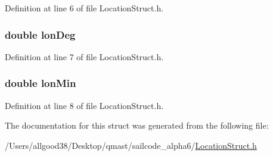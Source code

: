 \-Definition at line 6 of file \-Location\-Struct.\-h.

\hypertarget{structpoints_aa9d469451b350f942a352bf3a813fe81}{
\subsubsection[{lon\-Deg}]{\setlength{\rightskip}{0pt plus 5cm}double {\bf lon\-Deg}}}
\label{structpoints_aa9d469451b350f942a352bf3a813fe81}


\-Definition at line 7 of file \-Location\-Struct.\-h.

\hypertarget{structpoints_a1122975e5c72c0ad3044620006a92ee5}{
\subsubsection[{lon\-Min}]{\setlength{\rightskip}{0pt plus 5cm}double {\bf lon\-Min}}}
\label{structpoints_a1122975e5c72c0ad3044620006a92ee5}


\-Definition at line 8 of file \-Location\-Struct.\-h.



\-The documentation for this struct was generated from the following file\-:\begin{DoxyCompactItemize}
\item 
/\-Users/allgood38/\-Desktop/qmast/sailcode\-\_\-alpha6/\hyperlink{_location_struct_8h}{\-Location\-Struct.\-h}\end{DoxyCompactItemize}
